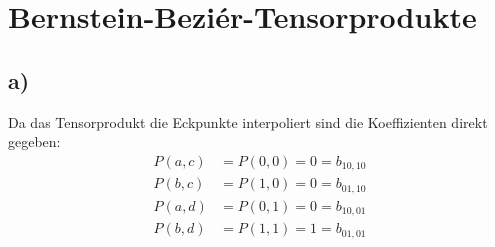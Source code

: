
\section*{Bernstein-Bezi\'er-Tensorprodukte}
\subsection*{a)} 


Da das Tensorprodukt die Eckpunkte interpoliert sind die Koeffizienten direkt gegeben:
\begin{align}
	P(a,c) &= P(0,0) = 0 = b_{10,10} \\
	P(b,c) &= P(1,0) = 0 = b_{01,10} \\
	P(a,d) &= P(0,1) = 0 = b_{10,01} \\
	P(b,d) &= P(1,1) = 1 = b_{01,01} \\
\end{align}


